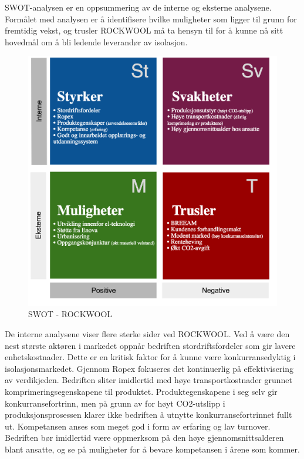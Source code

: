 SWOT-analysen er en oppsummering av de interne og eksterne analysene. Formålet med analysen er å identifisere hvilke muligheter som ligger til grunn for fremtidig vekst, og trusler ROCKWOOL må ta hensyn til for å kunne nå sitt hovedmål om å bli ledende leverandør av isolasjon.

\begin{figure}[H]
\centering
\includegraphics [scale=0.25]{bilder/swot.png}
\caption{SWOT - ROCKWOOL}
\label{fig:swot}
\end{figure}

\indent \newline
De interne analysene viser flere sterke sider ved ROCKWOOL. Ved å være den nest største aktøren i markedet oppnår bedriften stordriftsfordeler som gir lavere enhetskostnader. Dette er en kritisk faktor for å kunne være konkurransedyktig i isolasjonsmarkedet. Gjennom Ropex fokuseres det kontinuerlig på effektivisering av verdikjeden. Bedriften sliter imidlertid med høye transportkostnader grunnet komprimeringsegenskapene til produktet. Produktegenskapene i seg selv gir konkurransefortrinn, men på grunn av for høyt CO2-utslipp i produksjonsprosessen klarer ikke bedriften å utnytte konkurransefortrinnet fullt ut. Kompetansen anses som meget god i form av erfaring og lav turnover. Bedriften bør imidlertid være oppmerksom på den høye gjennomsnittsalderen blant ansatte, og se på muligheter for å bevare kompetansen i årene som kommer.

